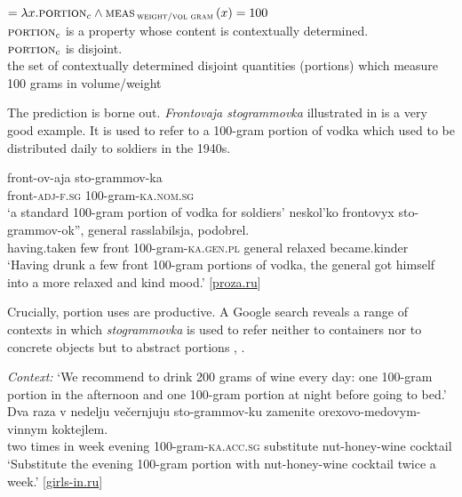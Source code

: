 \documentclass[output=paper,
colorlinks,
citecolor=brown,
newtxmath
]{langscibook}
\begin{document}
\ea\label{ex:khrizmann:37}  $= \lambda x.\textsc{portion}_{c} \wedge \textsc{meas}\,_{\textsc{weight/vol gram}}\,(x) = 100$\\
\hspace{.9em} {\small $\textsc{portion}_{c}$ is a property whose content is contextually determined.\\
\hspace{1em} $\textsc{portion}\textsubscript{c}$ is disjoint.\\
the set of contextually determined disjoint quantities (portions) which measure 100 grams in volume/weight}
\z

\noindent The prediction is borne out. \textit{Frontovaja stogrammovka} illustrated in  is a very good example. It is used to refer to a 100-gram portion of vodka which used to be distributed daily to soldiers in the 1940s.

\ea\label{ex:khrizmann:38}
    \ea \gll front-ov-aja sto-grammov-ka\\
    front-\textsc{adj-f.sg} 100-gram-\textsc{ka.nom.sg}\\
    \glt `a standard 100-gram portion of vodka for soldiers'
    \ex {} neskol'ko  frontovyx sto-grammov-ok'', general rasslabilsja, podobrel.\\
    having.taken few {} front 100-gram-\textsc{ka.gen.pl} general relaxed became.kinder\\
    \glt `Having drunk a few front 100-gram portions of vodka, the general got himself into a more relaxed and kind mood.' \hfill [\href{https://www.proza.ru/2012/07/06/1250}{proza.ru}]
\z\z

\noindent Crucially, portion uses are productive. A Google search reveals a range of contexts in which \textit{stogrammovka} is used to refer neither to containers nor to concrete objects but to abstract portions , .

\ea\label{ex:khrizmann:39} \textit{Context:} `We recommend to drink 200 grams of wine every day: one 100-gram portion in the afternoon and one 100-gram portion at night before going to bed.'\\
\gll Dva raza v nedelju večernjuju sto-grammov-ku zamenite orexovo-medovym-vinnym koktejlem.\\
two times in week evening 100-gram-\textsc{ka.acc.sg} substitute nut-honey-wine cocktail\\
\glt `Substitute the evening 100-gram portion with nut-honey-wine cocktail twice a week.' \hfill [\href{http://girls-in.ru/pub/1320}{girls-in.ru}]
\z
\end{document}
